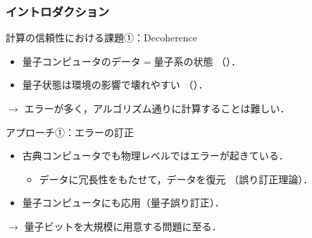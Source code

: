 \documentclass{beamer} %
\newcommand{\0}{\mathbf{0}}
\newcommand{\1}{\mathbf{1}}
\newcommand{\2}{\mathbf{2}}
\begin{document}
\begin{frame}
  \frametitle{イントロダクション}
  \begin{block}{計算の信頼性における課題①：Decoherence}
    \begin{itemize}
      \item 量子コンピュータのデータ\(=\)量子系の状態
            （）．
      \item 量子状態は環境の影響で壊れやすい
            （）．
    \end{itemize}
    \begin{center}
      \(\longrightarrow\)
      エラーが多く，アルゴリズム通りに計算することは難しい．
    \end{center}
  \end{block}

  \begin{block}{アプローチ①：エラーの訂正}
    \begin{itemize}
      \item 古典コンピュータでも物理レベルではエラーが起きている．
            \begin{itemize}
              \item データに冗長性をもたせて，データを復元
                    （誤り訂正理論）．
            \end{itemize}
      \item 量子コンピュータにも応用（量子誤り訂正）．
    \end{itemize}
    \begin{center}
      \(\longrightarrow\)
      量子ビットを大規模に用意する問題に至る．
    \end{center}
  \end{block}
\end{frame}
\end{document}
